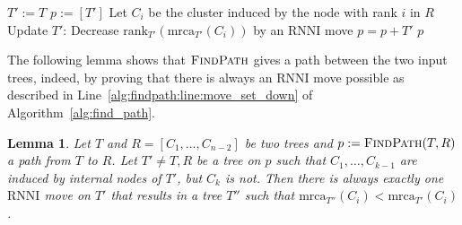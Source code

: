 \documentclass{amsart}
\newcommand{\mrca}{\mathrm{mrca}}
\newcommand{\rank}{\mathrm{rank}}
\newcommand{\rnni}{\mathrm{RNNI}}
\newcommand{\findpath}{\textsc{FindPath}}
\newtheorem{lemma}[definition]{Lemma}
\begin{document}
\begin{algorithm}[H]
\caption{$\findpath$($T,R$)}
\label{alg:find_path}
\begin{algorithmic}[1]
\STATE $T' := T$
\STATE $p := [T']$
\STATE Let $C_i$ be the cluster induced by the node with rank $i$ in $R$ \label{alg:find_path:line:cluster}
\WHILE {$\rank_{T'}(\mrca_{T'}(C_i))>i$}
\STATE Update $T'$: Decrease $\rank_{T'}(\mrca_{T'}(C_i))$ by an $\rnni$ move \label{alg:findpath:line:move_set_down}
\STATE $p = p+T'$
\ENDWHILE
\ENDFOR
\RETURN $p$
\end{algorithmic}
\end{algorithm}

The following lemma shows that $\findpath$ gives a path between the two input trees, indeed, by proving that there is always an $\rnni$ move possible as described in Line~\ref{alg:findpath:line:move_set_down} of Algorithm~\ref{alg:find_path}.

\begin{lemma}
Let $T$ and $R = [C_1, \ldots, C_{n-2}]$ be two trees and $p:= \findpath (T,R)$ a path from $T$ to $R$.
Let $T' \neq T,R$ be a tree on $p$ such that $C_1, \ldots, C_{k-1}$ are induced by internal nodes of $T'$, but $C_k$ is not.
Then there is always exactly one $\rnni$ move on $T'$ that results in a tree $T''$ such that $\mrca_{T''}(C_i) < \mrca_{T'}(C_i)$.
\label{lemma:mrca_move}
\end{lemma}
\end{document}
